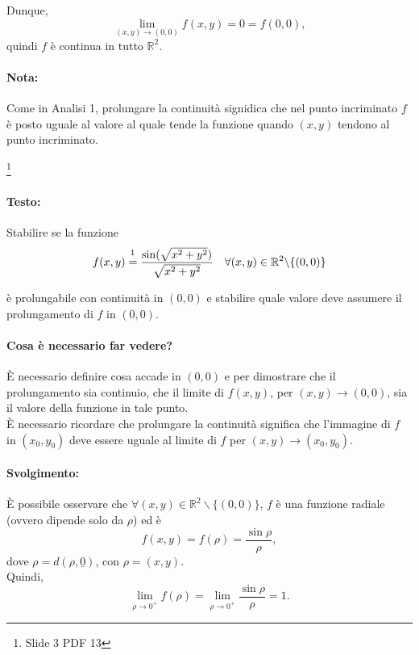 \begin{example}
	\noindent Dunque,
	\begin{equation*}
		\lim\limits_{(x,y)\rightarrow(0,0)} f(x,y) = 0 = f(0,0),
	\end{equation*}
	quindi $f$ è continua in tutto $\mathbb{R}^2$.
	
\end{example}

\paragraph{Nota:} Come in Analisi 1, prolungare la continuità signidica che nel punto incriminato $f$ è posto uguale al valore al quale tende la funzione quando $(x, y)$ tendono al punto incriminato.

\begin{example}\footnote{Slide 3 PDF 13}
	\paragraph{Testo:} Stabilire se la funzione
	\begin{equation*}
		f(x,y) \overset{\footnotemark}{=} \frac{\sin(\sqrt{x^2+y^2})}{\sqrt{x^2+y^2}}\quad \forall(x,y)\in\mathbb{R}^2\backslash\{(0,0)\}
	\end{equation*}
	
	\noindent è prolungabile con continuità in $(0,0)$ e stabilire quale valore deve assumere il prolungamento di $f$ in $(0,0)$.
	\paragraph{Cosa è necessario far vedere?} È necessario definire cosa accade in $(0,0)$ e per dimostrare che il prolungamento sia continuio, che il limite di $f(x,y)$, per $(x,y)\rightarrow(0,0)$, sia il valore della funzione in tale punto.\\
	È necessario ricordare che prolungare la continuità significa che l'immagine di $f$ in $(x_0,y_0)$ deve essere uguale al limite di $f$ per $(x,y)\rightarrow(x_0,y_0)$.
	\paragraph{Svolgimento:} È possibile osservare che $\forall (x,y)\in\mathbb R^2\backslash\{(0,0)\}$, $f$ è una funzione radiale (ovvero dipende solo da $\rho$) ed è
	\begin{equation*}
		f(x,y)=f(\rho)=\frac{\sin\rho}{\rho},
	\end{equation*}
	dove $\rho = d(\rho , \underline{0})$, con $\rho=(x,y)$.\\
	Quindi,
	\begin{equation*}
		\lim\limits_{\rho\rightarrow0^+} f(\rho)=\lim\limits_{\rho\rightarrow 0^+} \frac{\sin\rho}{\rho}=1.
	\end{equation*}

\end{example}
